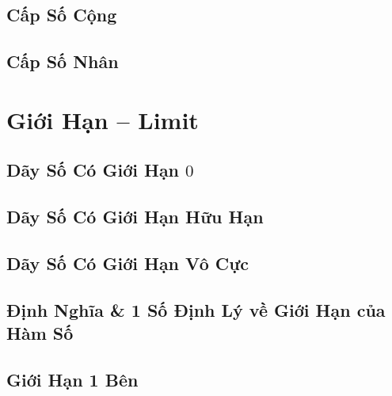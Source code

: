 \documentclass[oneside]{book}
\numberwithin{equation}{section}
\begin{document}

\section{Cấp Số Cộng}


\section{Cấp Số Nhân}


\chapter{Giới Hạn -- Limit}

\section{Dãy Số Có Giới Hạn $0$}


\section{Dãy Số Có Giới Hạn Hữu Hạn}


\section{Dãy Số Có Giới Hạn Vô Cực}


\section{Định Nghĩa \& 1 Số Định Lý về Giới Hạn của Hàm Số}


\section{Giới Hạn 1 Bên}
\end{document}
